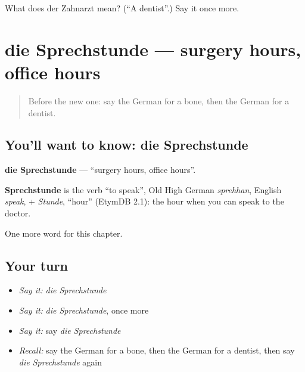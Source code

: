 \begin{tcolorbox}[breakable,colback=teal!4,colframe=teal!35!black,title={Before you move on}]
What does der Zahnarzt mean? (\textquotedblleft{}A dentist\textquotedblright{}.) Say it once more.
\end{tcolorbox}
\section[die Sprechstunde]{die Sprechstunde — surgery hours, office hours}

\label{lesson:GE-C205-sprechstunde}



\begin{quote}
Before the new one: say the German for a bone, then the German for a dentist.
\end{quote}

\subsection*{You'll want to know: die Sprechstunde}
\textbf{die Sprechstunde} — \textquotedblleft{}surgery hours, office hours\textquotedblright{}.

\begin{cousinweb}
\textbf{Sprechstunde} is the verb \textquotedblleft{}to speak\textquotedblright{}, Old High German \emph{sprehhan}, English \emph{speak}, + \emph{Stunde}, \textquotedblleft{}hour\textquotedblright{} (EtymDB 2.1): the hour when you can speak to the doctor.
\end{cousinweb}

\begin{grammarlens}[title={What you've built}]
One more word for this chapter.
\end{grammarlens}

\subsection*{Your turn}
\begin{itemize}
\raggedright
  \item \emph{Say it:} \emph{die Sprechstunde}
  \item \emph{Say it:} \emph{die Sprechstunde}, once more
  \item \emph{Say it:} say \emph{die Sprechstunde}
  \item \emph{Recall:} say the German for a bone, then the German for a dentist, then say \emph{die Sprechstunde} again
\end{itemize}

